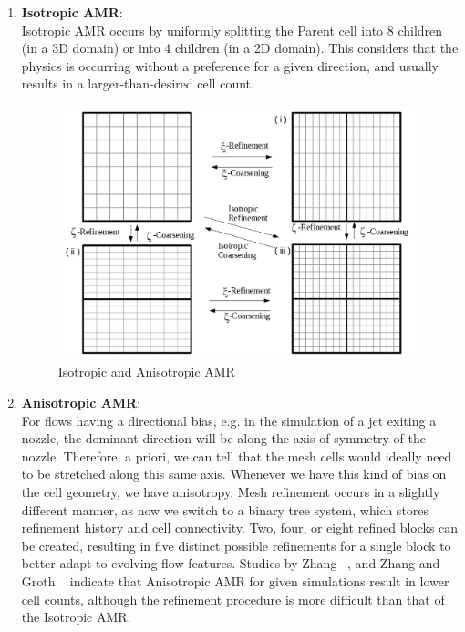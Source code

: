 \begin{enumerate}

\item \textbf{Isotropic AMR}:\\
Isotropic AMR  occurs by uniformly splitting the Parent cell into 8 children (in a 3D domain) or into 4 children (in a 2D domain). This considers that the physics is occurring without a preference for a given direction, and usually results in a larger-than-desired cell count.

\begin{figure}
    \vspace{0.2cm}
    \begin{center}
      \includegraphics[height=0.35\textwidth]{./figs/BlockDivision.jpg}
    \end{center}
    \caption{Isotropic and Anisotropic AMR \cite{Zhang:2011b}}  
    \vspace{0.2cm}
\end{figure}

\item \textbf{Anisotropic AMR}: \\
For flows having a directional bias, e.g. in the simulation of a jet exiting a nozzle, the dominant direction will be along the axis of symmetry of the nozzle. Therefore, a priori, we can tell that the mesh cells would ideally need to be stretched along this same axis. Whenever we have this kind of bias on the cell geometry, we have anisotropy. Mesh refinement occurs in a slightly different manner, as now we switch to a binary tree system, which stores refinement history and cell connectivity. Two, four, or eight refined blocks can be created, resulting in five distinct possible refinements for a single block to better adapt to evolving flow features. Studies by Zhang ~\cite{Zhang:2011b}, and Zhang and Groth ~\cite{Zhang:2011a} indicate that Anisotropic AMR for given simulations result in lower cell counts, although the refinement procedure is more difficult than that of the Isotropic AMR.\par



\end{enumerate}
